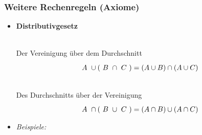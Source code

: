             \subsubsection{Weitere Rechenregeln (Axiome)} 
                \begin{itemize}
                    \item \textbf{Distributivgesetz} \\
                    \begin{minipage}{0.5\columnwidth}
                        ~ \\
                        Der Vereinigung über  dem Durchschnitt
                        \begin{equation*}
                            \tikz[baseline]{\node[anchor=base] (t1) {$ A$};} \cup (
                            \tikz[baseline]{\node[anchor=base] (t2) {$B$}; } \cap
                            \tikz[baseline]{\node[anchor=base] (t3) {$C$}; } ) = (A\cup B) \cap (A\cup C)
                        \end{equation*}
                    \end{minipage}
                    \begin{minipage}{0.5\columnwidth}
                        ~ \\
                        Des Durchschnitts über der Vereinigung
                        \begin{equation*}
                            \tikz[baseline]{\node[anchor=base] (t1) {$ A$};} \cap (
                            \tikz[baseline]{\node[anchor=base] (t2) {$B$}; } \cup
                            \tikz[baseline]{\node[anchor=base] (t3) {$C$}; } ) = (A\cap B) \cup (A\cap C)
                        \end{equation*}
                    \end{minipage}
                    \item[] \textit{Beispiele:}

\end{itemize}
